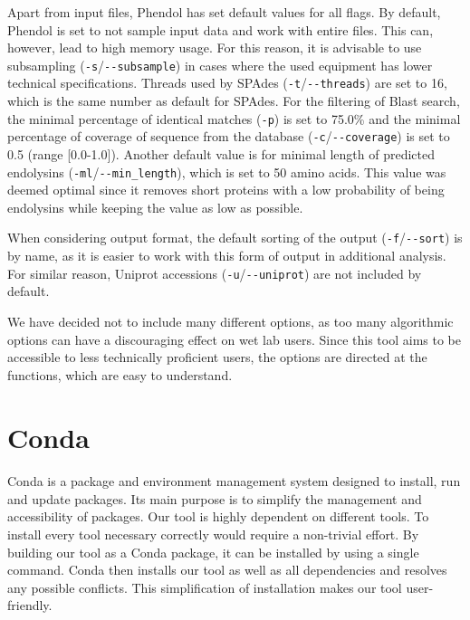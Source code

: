 Apart from input files, Phendol has set default values for all flags. By default, Phendol is set to not sample input data and work with entire files. This can, however, lead to high memory usage. For this reason, it is advisable to use subsampling (\texttt{-s}/\texttt{-{}-subsample}) in cases where the used equipment has lower technical specifications. Threads used by SPAdes (\texttt{-t}/\texttt{-{}-threads}) are set to 16, which is the same number as default for SPAdes. For the filtering of Blast search, the minimal percentage of identical matches (\texttt{-p}) is set to 75.0\% and the minimal percentage of coverage of sequence from the database (\texttt{-c}/\texttt{-{}-coverage}) is set to 0.5 (range [0.0-1.0]). Another default value is for minimal length of predicted endolysins (\texttt{-ml}/\texttt{-{}-min\_length}), which is set to 50 amino acids. This value was deemed optimal since it removes short proteins with a low probability of being endolysins while keeping the value as low as possible. 

When considering output format, the default sorting of the output (\texttt{-f}/\texttt{-{}-sort}) is by name, as it is easier to work with this form of output in additional analysis. For similar reason, Uniprot accessions (\texttt{-u}/\texttt{-{}-uniprot}) are not included by default.

We have decided not to include many different options, as too many algorithmic options can have a discouraging effect on wet lab users. Since this tool aims to be accessible to less technically proficient users, the options are directed at the functions, which are easy to understand.

\section{Conda}
\paragraph*{}
Conda\cite{yan2018hands} is a package and environment management system designed to install, run and update packages. Its main purpose is to simplify the management and accessibility of packages. Our tool is highly dependent on different tools. To install every tool necessary correctly would require a non-trivial effort. By building our tool as a Conda package, it can be installed by using a single command. Conda then installs our tool as well as all dependencies and resolves any possible conflicts. This simplification of installation makes our tool user-friendly.

